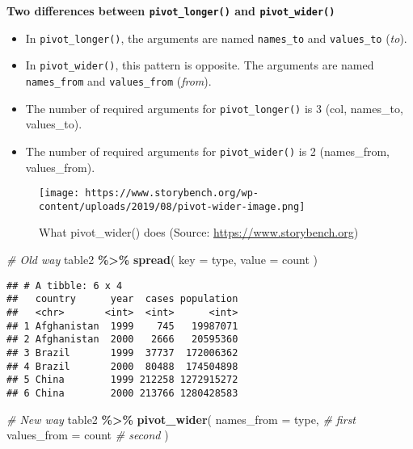 \documentclass[
]{book}
\newenvironment{Shaded}{\begin{snugshade}}{\end{snugshade}}
\newcommand{\CommentTok}[1]{\textcolor[rgb]{0.56,0.35,0.01}{\textit{#1}}}
\newcommand{\DataTypeTok}[1]{\textcolor[rgb]{0.13,0.29,0.53}{#1}}
\newcommand{\KeywordTok}[1]{\textcolor[rgb]{0.13,0.29,0.53}{\textbf{#1}}}
\newcommand{\NormalTok}[1]{#1}
\newcommand{\OperatorTok}[1]{\textcolor[rgb]{0.81,0.36,0.00}{\textbf{#1}}}
\newcommand{\StringTok}[1]{\textcolor[rgb]{0.31,0.60,0.02}{#1}}
\begin{document}
\textbf{Two differences between \texttt{pivot\_longer()} and \texttt{pivot\_wider()}}

\begin{itemize}
\item
  In \texttt{pivot\_longer()}, the arguments are named \texttt{names\_to} and \texttt{values\_to} (\emph{to}).
\item
  In \texttt{pivot\_wider()}, this pattern is opposite. The arguments are named \texttt{names\_from} and \texttt{values\_from} (\emph{from}).
\item
  The number of required arguments for \texttt{pivot\_longer()} is 3 (col, names\_to, values\_to).
\item
  The number of required arguments for \texttt{pivot\_wider()} is 2 (names\_from, values\_from).
\end{itemize}

\begin{figure}
\centering
\texttt{[image: https://www.storybench.org/wp-content/uploads/2019/08/pivot-wider-image.png]}
\caption{What pivot\_wider() does (Source: \url{https://www.storybench.org})}
\end{figure}

\begin{Shaded}
\begin{Highlighting}[]
\CommentTok{\# Old way}
\NormalTok{table2 }\OperatorTok{\%\textgreater{}\%}
\StringTok{  }\KeywordTok{spread}\NormalTok{(}
    \DataTypeTok{key =}\NormalTok{ type,}
    \DataTypeTok{value =}\NormalTok{ count}
\NormalTok{  )}
\end{Highlighting}
\end{Shaded}

\begin{verbatim}
## # A tibble: 6 x 4
##   country      year  cases population
##   <chr>       <int>  <int>      <int>
## 1 Afghanistan  1999    745   19987071
## 2 Afghanistan  2000   2666   20595360
## 3 Brazil       1999  37737  172006362
## 4 Brazil       2000  80488  174504898
## 5 China        1999 212258 1272915272
## 6 China        2000 213766 1280428583
\end{verbatim}

\begin{Shaded}
\begin{Highlighting}[]
\CommentTok{\# New way}
\NormalTok{table2 }\OperatorTok{\%\textgreater{}\%}
\StringTok{  }\KeywordTok{pivot\_wider}\NormalTok{(}
    \DataTypeTok{names\_from =}\NormalTok{ type, }\CommentTok{\# first}
    \DataTypeTok{values\_from =}\NormalTok{ count }\CommentTok{\# second}
\NormalTok{  )}
\end{Highlighting}
\end{Shaded}
\end{document}
